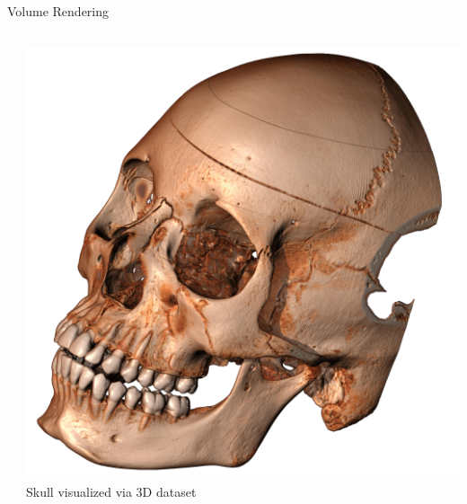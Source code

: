 \documentclass[10pt,compress,professionalfont]{beamer}
\begin{document}
\begin{frame}{Volume Rendering}
\begin{columns}
\begin{column}{0.6\textwidth}
        \end{column}
        \begin{column}{0.4\textwidth}
            \includegraphics[width=\textwidth]{../img/external/skull}\\
            {\centering\scriptsize Skull visualized via 3D dataset\\}
        \end{column}
    \end{columns}

\end{frame}
\end{document}
